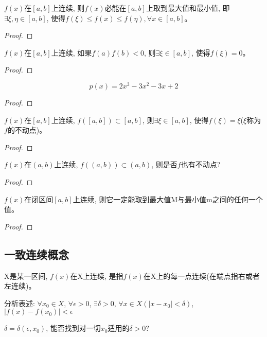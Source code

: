 \documentclass[lang=cn]{elegantbook}
\begin{document}
\begin{theorem}[最值定理]
    $f(x)$在$[a, b]$上连续, 则$f(x)$必能在$[a, b]$上取到最大值和最小值, 即$\exists \xi, \eta \in [a, b]$, 使得$f(\xi) \le f(x) \le f(\eta), \forall x \in [a, b]$。
\end{theorem}
\begin{proof}
    
\end{proof}

\begin{theorem}[零点存在定理]
    $f(x)$在$[a, b]$上连续, 如果$f(a)f(b) < 0$, 则$\exists \xi \in [a, b]$, 使得$f(\xi) = 0$。
\end{theorem}
\begin{proof}
    
\end{proof}

\begin{proposition}
    \[ p(x) = 2x^3-3x^2-3x+2 \]
\end{proposition}
\begin{proof}
    
\end{proof}

\begin{proposition}
    $f(x)$在$[a, b]$上连续, $f([a, b]) \subset [a, b]$, 则$\exists \xi \in [a, b]$, 使得$f(\xi) = \xi$($\xi$称为$f$的不动点)。
\end{proposition}
\begin{proof}
    
\end{proof}

\begin{proposition}
    $f(x)$在$(a, b)$上连续, $f((a, b)) \subset (a, b)$, 则是否$f$也有不动点?
\end{proposition}
\begin{proof}
    
\end{proof}

\begin{theorem}[中间值定理]
    $f(x)$在闭区间$[a, b]$上连续, 则它一定能取到最大值M与最小值m之间的任何一个值。
\end{theorem}
\begin{proof}
    
\end{proof}

\subsection{一致连续概念}
\begin{definition}
    X是某一区间, $f(x)$在X上连续, 是指$f(x)$在X上的每一点连续(在端点指右或者左连续)。

    分析表述: $\forall x_0 \in X$, $\forall \epsilon > 0$, $\exists \delta > 0$, $\forall x \in X(\left| x - x_0 \right| < \delta)$, $\left| f(x) - f(x_0) \right| < \epsilon$
\end{definition}
$\delta = \delta(\epsilon, x_0)$, 能否找到对一切$x_0$适用的$\delta > 0$?
\end{document}
